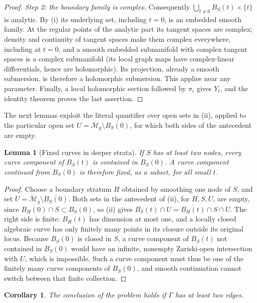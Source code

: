 \documentclass[12pt]{article}
\newcommand{\M}{\mathcal M}
\newcommand{\cl}[1]{\overline{#1}}
\newtheorem{lemma}[theorem]{Lemma}
\newtheorem{corollary}[theorem]{Corollary}
\theoremstyle{remark}
\begin{document}
\begin{proof}
\emph{Step 2: the boundary family is complex.}
Consequently \(\bigcup_{t\ne0}B_S(t)\times\{t\}\) is analytic.
By (i) its underlying set, including \(t=0\), is an embedded
smooth family. At the regular points of the analytic part its
tangent spaces are complex; density and continuity of tangent
spaces make them complex everywhere, including at \(t=0\), and
a smooth embedded submanifold with complex tangent spaces
is a complex submanifold (its local graph maps have complex-linear
differentials, hence are holomorphic).
Its projection, already a smooth submersion, is therefore
a holomorphic submersion. This applies near any parameter.
Finally, a local holomorphic section followed by \(\pi_i\) gives
\(Y_t\), and the identity theorem proves the last assertion.
\end{proof}

The next lemmas exploit the literal quantifier over open sets in
(ii), applied to the particular open set
\(U=\cl{\M}_g\setminus\cl{B_S(0)}\), for which both sides of the
antecedent are empty.

\begin{lemma}[Fixed curves in deeper strata]\label{lem:deep}
If \(S\) has at least two nodes, every curve component of \(B_S(t)\)
is contained in \(B_S(0)\). A curve component continued from
\(B_S(0)\) is therefore fixed, as a subset, for all small \(t\).
\end{lemma}

\begin{proof}
Choose a boundary stratum \(H\) obtained by smoothing one node of
\(S\), and set \(U=\cl{\M}_g\setminus\cl{B_S(0)}\).
Both sets in the antecedent of (ii), for \(H,S,U\), are empty, since
\(\cl{B_H(0)}\cap S\subset B_S(0)\), so (ii) gives
\(B_S(t)\cap U=\cl{B_H(t)}\cap S\cap U\).
The right side is finite: \(B_H(t)\) has dimension at most
one, and a locally closed algebraic curve has only finitely many
points in its closure outside its original locus.
Because \(B_S(0)\) is closed in \(S\), a curve component of \(B_S(t)\)
not contained in \(B_S(0)\) would have an infinite, nonempty
Zariski-open intersection with \(U\), which is impossible. Such a
curve component must thus be one of the finitely many curve
components of \(B_S(0)\), and smooth continuation cannot switch
between that finite collection.
\end{proof}

\begin{corollary}\label{cor:deep}
The conclusion of the problem holds if \(\Gamma\) has at least two
edges.
\end{corollary}
\end{document}
